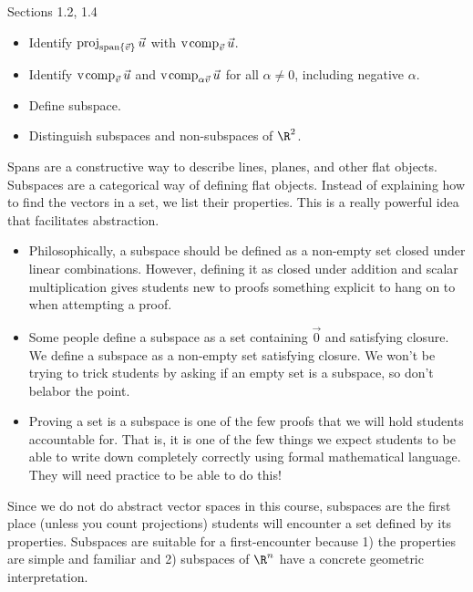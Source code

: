\begin{lesson}

	Sections 1.2, 1.4

	\begin{itemize}
		\item Identify $\operatorname{proj}_{\operatorname{span}\{\vec v\}}\vec u$ with $\operatorname{\operatorname{v\hspace{1pt}comp}}_{\vec v}\vec u$.
		\item Identify $\operatorname{\operatorname{v\hspace{1pt}comp}}_{\vec v}\vec u$ and $\operatorname{\operatorname{v\hspace{1pt}comp}}_{\alpha\vec v}\vec u$
			for all $\alpha\neq 0$, including negative $\alpha$.
		\item Define subspace.
		\item Distinguish subspaces and non-subspaces of $\R^2$.
	\end{itemize}

	Spans are a constructive way to describe lines, planes, and other
	flat objects. Subspaces are a categorical way of defining flat objects.
	Instead of explaining how to find the vectors in a set, we list their
	properties. This is a really powerful idea that facilitates abstraction.

	\begin{annotation}
		\begin{notes}
			\begin{itemize}
			\item	Philosophically, a subspace should be defined
			as a non-empty set closed under linear combinations.
			However, defining it as closed under addition and scalar
			multiplication gives students new to proofs
			something explicit to hang on to when attempting a proof.
			\item Some people define a subspace as a set containing
			$\vec 0$ and satisfying closure. We define a subspace
			as a non-empty set satisfying closure. We won't be trying
			to trick students by asking if an empty set is a subspace,
			so don't belabor the point.
			\item Proving a set is a subspace is one of the few proofs
				that we will hold students accountable for. That is,
					it is one of the few things we expect
					students to be able to write down completely
					correctly using formal mathematical language.
					They will need practice to be able to do this!
			\end{itemize}
		\end{notes}
	\end{annotation}
	Since we do not do abstract vector spaces in this course, subspaces are
	the first place (unless you count projections) students will encounter
	a set defined by its properties. Subspaces are suitable for a first-encounter
	because 1) the properties are simple and familiar and 2) subspaces of $\R^n$
	have a concrete geometric interpretation.

\end{lesson}

